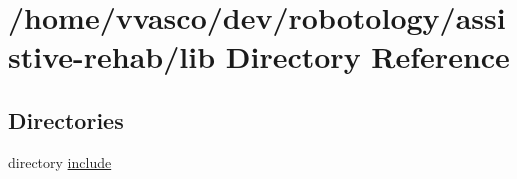 \section{/home/vvasco/dev/robotology/assistive-\/rehab/lib Directory Reference}
\label{dir_97aefd0d527b934f1d99a682da8fe6a9}
\subsection*{Directories}
\begin{DoxyCompactItemize}
\item 
directory \hyperlink{dir_5a30104352ef4255dc24354b02eb2d20}{include}
\end{DoxyCompactItemize}
